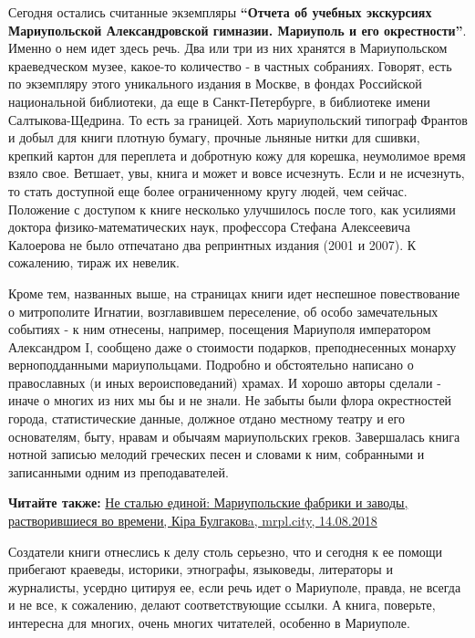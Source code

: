 Сегодня остались считанные экземпляры \textbf{\enquote{Отчета об учебных экскурсиях
Мариупольской Александровской гимназии. Мариуполь и его окрестности}}. Именно о
нем идет здесь речь. Два или три из них хранятся в Мариупольском краеведческом
музее, какое-то количество - в частных собраниях. Говорят, есть по экземпляру
этого уникального издания в Москве, в фондах Российской национальной
библиотеки, да еще в Санкт-Петербурге, в библиотеке имени Салтыкова-Щедрина. То
есть за границей. Хоть мариупольский типограф Франтов и добыл для книги плотную
бумагу, прочные льняные нитки для сшивки, крепкий картон для переплета и
добротную кожу для корешка, неумолимое время взяло свое. Ветшает, увы, книга и
может и вовсе исчезнуть. Если и не исчезнуть, то стать доступной еще более
ограниченному кругу людей, чем сейчас. Положение с доступом к книге несколько
улучшилось после того, как усилиями доктора физико-математических наук,
профессора Стефана Алексеевича Калоерова не было отпечатано два репринтных
издания (2001 и 2007). К сожалению, тираж их невелик.


Кроме тем, названных выше, на страницах книги идет неспешное повествование о
митрополите Игнатии, возглавившем переселение, об особо замечательных событиях
- к ним отнесены, например, посещения Мариуполя императором Александром I,
сообщено даже о стоимости подарков, преподнесенных монарху верноподданными
мариупольцами. Подробно и обстоятельно написано о православных (и иных
вероисповеданий) храмах. И хорошо авторы сделали - иначе о многих из них мы бы
и не знали. Не забыты были флора окрестностей города, статистические данные,
должное отдано местному театру и его основателям, быту, нравам и обычаям
мариупольских греков. Завершалась книга нотной записью мелодий греческих песен
и словами к ним, собранными и записанными одним из преподавателей.

\textbf{Читайте также:} \href{https://mrpl.city/news/view/ne-stalyu-edinoj-mariupolskie-fabriki-i-zavody-rastvorivshiesya-vo-vremeni}{%
Не сталью единой: Мариупольские фабрики и заводы, растворившиеся во времени, Кіра Булгаковa, mrpl.city, 14.08.2018}

Создатели книги отнеслись к делу столь серьезно, что и сегодня к ее помощи
прибегают краеведы, историки, этнографы, языковеды, литераторы и журналисты,
усердно цитируя ее, если речь идет о Мариуполе, правда, не всегда и не все, к
сожалению, делают соответствующие ссылки. А книга, поверьте, интересна для
многих, очень многих читателей, особенно в Мариуполе.
